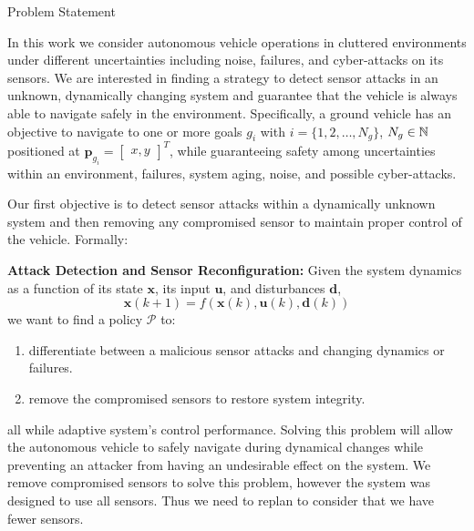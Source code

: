 \begin{section}{Problem Statement}
	
\label{sec:problem}

In this work we consider autonomous vehicle operations in cluttered environments under different uncertainties including noise, failures, and cyber-attacks on its sensors. 
We are interested in finding a strategy to detect sensor attacks in an unknown, dynamically changing system and guarantee that the vehicle is always able to navigate safely in the environment. Specifically, a ground vehicle has an objective to navigate to one or more goals $g_i$ with $ i = \{1, 2, \dots, N_g\}$, $N_g \in \mathbb{N}$ positioned at $\bm{p}_{g_i}={\begin{bmatrix} x,y \end{bmatrix}}^T$, while guaranteeing safety among uncertainties within an environment, failures, system aging, noise, and possible cyber-attacks.





Our first objective is to detect sensor attacks within a dynamically unknown system and then removing any compromised sensor to maintain proper control of the vehicle. Formally:

\begin{problem} 
\label{problem1} {\textbf{Attack Detection and Sensor Reconfiguration:}} 
 Given the system dynamics as a function of its state $ \bm{x} $, its input $ \bm{u}$, and disturbances $ \bm{d} $,
	\begin{equation}
		\bm{x}(k+1) = f(\bm{x}(k), \bm{u}(k), \bm{d}(k))
	\end{equation}
we want to find a policy $\mathcal{P}$ to:
\begin{enumerate}
	\item differentiate between a malicious sensor attacks and changing dynamics or failures. 
	\item remove the compromised sensors to restore system integrity. %
\end{enumerate}
all while adaptive system's control performance. Solving this problem will allow the autonomous vehicle to safely navigate during dynamical changes while preventing an attacker from having an undesirable effect on the system. We remove compromised sensors to solve this problem, however the system was designed to use all sensors. Thus we need to replan to consider that we have fewer sensors.
\end{problem}
	

\end{section}
